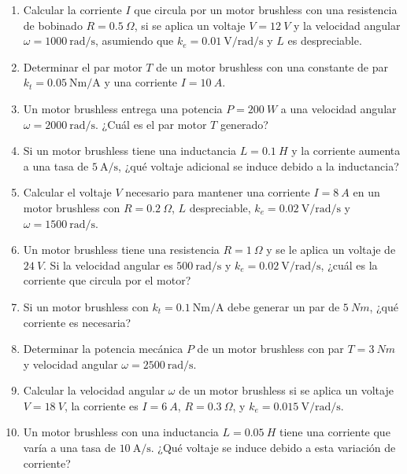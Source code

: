 \documentclass[../main]{subfiles}
\begin{document}
\begin{enumerate}
\item Calcular la corriente $I$ que circula por un motor brushless con una resistencia de bobinado $R = 0.5\ \Omega$, si se aplica un voltaje $V = 12\ V$ y la velocidad angular $\omega = 1000\ \text{rad/s}$, asumiendo que $k_e = 0.01\ \text{V/rad/s}$ y $L$ es despreciable.
\item Determinar el par motor $T$ de un motor brushless con una constante de par $k_t = 0.05\ \text{Nm/A}$ y una corriente $I = 10\ A$.
\item Un motor brushless entrega una potencia $P = 200\ W$ a una velocidad angular $\omega = 2000\ \text{rad/s}$. ¿Cuál es el par motor $T$ generado?
\item Si un motor brushless tiene una inductancia $L = 0.1\ H$ y la corriente aumenta a una tasa de $5\ \text{A/s}$, ¿qué voltaje adicional se induce debido a la inductancia?
\item Calcular el voltaje $V$ necesario para mantener una corriente $I = 8\ A$ en un motor brushless con $R = 0.2\ \Omega$, $L$ despreciable, $k_e = 0.02\ \text{V/rad/s}$ y $\omega = 1500\ \text{rad/s}$.
\item Un motor brushless tiene una resistencia $R = 1\ \Omega$ y se le aplica un voltaje de $24\ V$. Si la velocidad angular es $500\ \text{rad/s}$ y $k_e = 0.02\ \text{V/rad/s}$, ¿cuál es la corriente que circula por el motor?
\item Si un motor brushless con $k_t = 0.1\ \text{Nm/A}$ debe generar un par de $5\ Nm$, ¿qué corriente es necesaria?
\item Determinar la potencia mecánica $P$ de un motor brushless con par $T = 3\ Nm$ y velocidad angular $\omega = 2500\ \text{rad/s}$.
\item Calcular la velocidad angular $\omega$ de un motor brushless si se aplica un voltaje $V = 18\ V$, la corriente es $I = 6\ A$, $R = 0.3\ \Omega$, y $k_e = 0.015\ \text{V/rad/s}$.
\item Un motor brushless con una inductancia $L = 0.05\ H$ tiene una corriente que varía a una tasa de $10\ \text{A/s}$. ¿Qué voltaje se induce debido a esta variación de corriente?
\end{enumerate}
\end{document}
